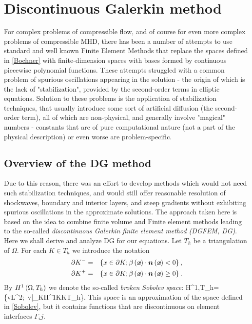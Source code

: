 \section{Discontinuous Galerkin method}

For complex problems of compressible flow, and of course for even more complex problems of compressible MHD, there has been a number of attempts to use standard and well known Finite Element Methods that replace the spaces defined in \ref{Bochner} with finite-dimension spaces with bases formed by continuous piecewise polynomial functions. These attempts struggled with a common problem of spurious oscillations appearing in the solution - the origin of which is the lack of "stabilization", provided by the second-order terms in elliptic equations. Solution to these problems is the application of stabilization techniques, that usually introduce some sort of artificial diffusion (the second-order term), all of which are non-physical, and generally involve "magical" numbers - constants that are of pure computational nature (not a part of the physical description) or even worse are problem-specific.

\subsection{Overview of the DG method}
Due to this reason, there  was an effort to develop methods which would not need such stabilization techniques, and would still offer reasonable resolution of shockwaves, boundary and interior layers, and steep gradients without exhibiting spurious oscillations in the approximate solutions. The approach taken here is based on the idea to combine finite volume and Finite element methods leading to the so-called \emph{discontinuous Galerkin finite element method (DGFEM, DG)}. Here we shall derive and analyze DG for our equations. Let $T_h$ be a triangulation of $\Omega$. For each $K\in T_h$ we introduce the notation
\begin{eqnarray}
\partial K^- & = & \left\{x\in\partial K;\beta\left(\textit{\textbf{x}}\right)\cdot\mbox{\boldmath $n$}\left(\textit{\textbf{x}}\right) <0\right\},\\
\partial K^+ & = & \left\{x\in\partial K;\beta\left(\textit{\textbf{x}}\right)\cdot\mbox{\boldmath $n$}\left(\textit{\textbf{x}}\right) \geq 0\right\}.
\end{eqnarray}
By $H^1\left(\Omega, T_h\right)$ we denote the so-called \textit{broken Sobolev space}:
\be
\label{BrokenSobolev} H^1\lo\Omega,T_h\ro = \left\{v\in L^2\lo\Omega\ro;\ v|_K\in H^1\lo K\ro \forall K\in T_h\right\}.
\ee
This space is an approximation of the space defined in \ref{Sobolev}, but it contains functions that are discontinuous on element interfaces $\Gamma_ij$.

